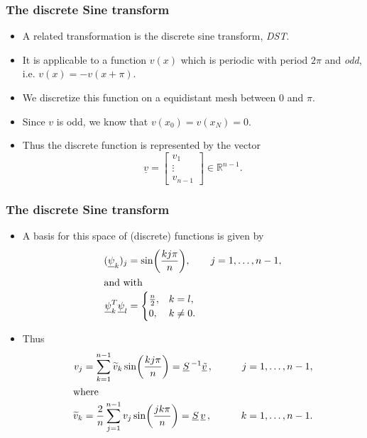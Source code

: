 \documentclass{beamer}
\newcommand{\ub}[1]{\underbar{$#1$}\,}
\begin{document}
\begin{frame}\frametitle{The discrete Sine transform}
  \begin{itemize}
    \item A related transformation is the discrete sine transform, \emph{DST}.
    \item It is applicable to a function $v(x)$ which is periodic with period
        $2\pi$ and \emph{odd}, i.e. $v(x) = -v(x+\pi)$.
     \item We discretize this function on a equidistant mesh between $0$ and $\pi$.
     \item Since $v$ is odd, we know that $v\left(x_0\right) = v\left(x_N\right) = 0$.
     \item Thus the discrete function is represented by the vector
       \[
        \underline{v} = 
        \begin{bmatrix}
          v_1 \\
          \vdots \\
          v_{n-1}
        \end{bmatrix}
        \in \mathbb{R}^{n-1}.
      \]
  \end{itemize}
\end{frame}
\begin{frame}\frametitle{The discrete Sine transform}
  \begin{itemize}
    \item A basis for this space of (discrete) functions is given by
    \begin{align*}
      (\underline{\psi}_k)_j &= \sin \biggl( \frac{k j \pi}{n} \biggr), \qquad j=1,\ldots,n-1, \\
      \intertext{and with}
      \underline{\psi}_k^T \underline{\psi}_l &=
      \begin{cases}
        \frac{n}{2}, & k=l, \\
        0, & k \not= 0.
      \end{cases}
    \end{align*}
    \item Thus
      \begin{alignat*}{2}
        v_j &= \sum_{k=1}^{n-1} \widetilde{v}_k \sin \biggl( \frac{k j \pi}{n} \biggr) = \ub{S}^{-1}\tilde{\ub{v}}, &\qquad j&=1,\ldots,n-1, \\
        \intertext{where}
        \widetilde{v}_k &= \frac{2}{n} \sum_{j=1}^{n-1} v_j \sin \biggl( \frac{j k \pi}{n} \biggr)=\ub{S}\ub{v}, &\qquad  k&=1,\ldots,n-1.
      \end{alignat*}
  \end{itemize}
\end{frame}
\end{document}
